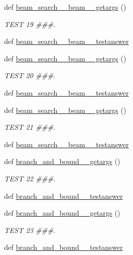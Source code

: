 \begin{DoxyCompactItemize}
def \hyperlink{namespacetests_ad78b8aaf87e10054e4831b588a30b52e}{beam\+\_\+search\+\_\+\_\+beam\+\_\+\_\+getargs} ()
\begin{DoxyCompactList}\small\item\em T\+E\+S\+T 19 \#\#\#. \end{DoxyCompactList}\item 
def \hyperlink{namespacetests_a66d0600726ea57c6b4e44a29a4040471}{beam\+\_\+search\+\_\+\_\+beam\+\_\+\_\+testanswer}
\item 
def \hyperlink{namespacetests_a7c864aabda9c4fb45c0aef46c9184720}{beam\+\_\+search\+\_\+\_\+beam\+\_\+\_\+getargs} ()
\begin{DoxyCompactList}\small\item\em T\+E\+S\+T 20 \#\#\#. \end{DoxyCompactList}\item 
def \hyperlink{namespacetests_af6af3e0388f067efc21df38641c38e83}{beam\+\_\+search\+\_\+\_\+beam\+\_\+\_\+testanswer}
\item 
def \hyperlink{namespacetests_a707c6426afe1814701dd4c3f5d753fc0}{beam\+\_\+search\+\_\+\_\+beam\+\_\+\_\+getargs} ()
\begin{DoxyCompactList}\small\item\em T\+E\+S\+T 21 \#\#\#. \end{DoxyCompactList}\item 
def \hyperlink{namespacetests_a758d1af6aa744b9504c41a5e458a6df9}{beam\+\_\+search\+\_\+\_\+beam\+\_\+\_\+testanswer}
\item 
def \hyperlink{namespacetests_ac5d3c5f10922c63b960d19024e6e63e7}{branch\+\_\+and\+\_\+bound\+\_\+\_\+getargs} ()
\begin{DoxyCompactList}\small\item\em T\+E\+S\+T 22 \#\#\#. \end{DoxyCompactList}\item 
def \hyperlink{namespacetests_a7ce81ccfd5e4f50e430d742a9c2dc1a4}{branch\+\_\+and\+\_\+bound\+\_\+\_\+testanswer}
\item 
def \hyperlink{namespacetests_ac7485ffa56361305f6621f129e9490b8}{branch\+\_\+and\+\_\+bound\+\_\+\_\+getargs} ()
\begin{DoxyCompactList}\small\item\em T\+E\+S\+T 23 \#\#\#. \end{DoxyCompactList}\item 
def \hyperlink{namespacetests_ad731cae0a414565c27bd35e69a12d994}{branch\+\_\+and\+\_\+bound\+\_\+\_\+testanswer}

\end{DoxyCompactItemize}
